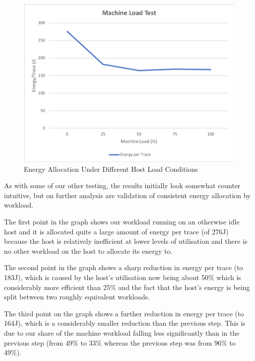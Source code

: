 \begin{figure}
\centering
\includegraphics[width=1.0\textwidth]{Figures/validation-machineload}
\caption{Energy Allocation Under Different Host Load Conditions}
\label{figure:validation-machineload}
\end{figure}

As with some of our other testing, the results initially look somewhat counter intuitive, but on further analysis are validation of consistent energy allocation by workload.


The first point in the graph shows our workload running on an otherwise idle host and it is allocated quite a large amount of energy per trace (of 276J) because the host is relatively inefficient at lower levels of utilisation and there is no other workload on the host to allocate its energy to.

The second point in the graph shows a sharp reduction in energy per trace (to 183J), which is caused by the host's utilisation now being about 50\% which is considerably more efficient than 25\% and the fact that the host's energy is being split between two roughly equivalent workloads.

The third point on the graph shows a further reduction in energy per trace (to 164J), which is a considerably smaller reduction than the previous step.  This is due to our share of the machine workload falling less significantly than in the previous step (from 49\% to 33\% whereas the previous step was from 96\% to 49\%).

